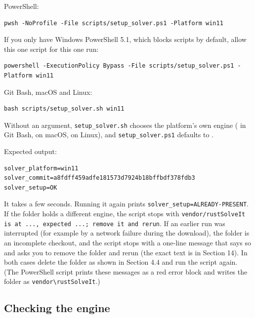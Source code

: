 \documentclass[11pt]{article}
\begin{document}
PowerShell:

\begin{Verbatim}[fontsize=\small]
pwsh -NoProfile -File scripts/setup_solver.ps1 -Platform win11
\end{Verbatim}

If you only have Windows PowerShell 5.1, which blocks scripts by default, allow this one script for this one run:

\begin{Verbatim}[fontsize=\small]
powershell -ExecutionPolicy Bypass -File scripts/setup_solver.ps1 -Platform win11
\end{Verbatim}

Git Bash, macOS and Linux:

\begin{Verbatim}[fontsize=\small]
bash scripts/setup_solver.sh win11
\end{Verbatim}

Without an argument, \texttt{setup\_so\allowbreak{}lver.sh} chooses the platform's own engine (\texttt{} in Git Bash, \texttt{} on macOS, \texttt{} on Linux), and \texttt{setup\_so\allowbreak{}lver.ps1} defaults to \texttt{}.

Expected output:

\begin{Verbatim}[fontsize=\small]
solver_platform=win11
solver_commit=a8fdff459adfe181573d7924b18bffbdf378fdb3
solver_setup=OK
\end{Verbatim}

It takes a few seconds. Running it again prints \texttt{solver\_s\allowbreak{}etup=ALR\allowbreak{}EADY-PRE\allowbreak{}SENT}. If the folder holds a different engine, the script stops with \texttt{vendor/r\allowbreak{}ustSolve\allowbreak{}It is at\allowbreak{} ..., ex\allowbreak{}pected .\allowbreak{}..; remo\allowbreak{}ve it an\allowbreak{}d rerun}. If an earlier run was interrupted (for example by a network failure during the download), the folder is an incomplete checkout, and the script stops with a one-line message that says so and asks you to remove the folder and rerun (the exact text is in Section 14). In both cases delete the folder as shown in Section 4.4 and run the script again. (The PowerShell script prints these messages as a red error block and writes the folder as \texttt{vendor\textbackslash{}r\allowbreak{}ustSolve\allowbreak{}It}.)

\subsection{Checking the engine}
\end{document}
